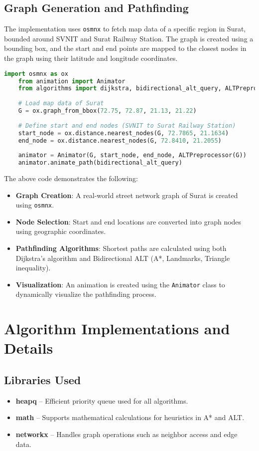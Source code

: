\subsection{Graph Generation and Pathfinding}
The implementation uses \texttt{osmnx} to fetch map data of a specific region in Surat, bounded around SVNIT and Surat Railway Station. The graph is created using a bounding box, and the start and end points are mapped to the closest nodes in the graph using their latitude and longitude coordinates.

\begin{lstlisting}[language=Python, caption={Pathfinding and Animation Code}, label={lst:pathfinding}]
	import osmnx as ox
	from animation import Animator
	from algorithms import dijkstra, bidirectional_alt_query, ALTPreprocessor
	
	# Load map data of Surat
	G = ox.graph_from_bbox(72.75, 72.87, 21.13, 21.22)
	
	# Define start and end nodes (SVNIT to Surat Railway Station)
	start_node = ox.distance.nearest_nodes(G, 72.7865, 21.1634)
	end_node = ox.distance.nearest_nodes(G, 72.8410, 21.2055)
	
	animator = Animator(G, start_node, end_node, ALTPreprocessor(G))
	animator.animate_path(bidirectional_alt_query)
\end{lstlisting}


The above code demonstrates the following:
\begin{itemize}
	\item \textbf{Graph Creation}: A real-world street network graph of Surat is created using \texttt{osmnx}.
	\item \textbf{Node Selection}: Start and end locations are converted into graph nodes using geographic coordinates.
	\item \textbf{Pathfinding Algorithms}: Shortest paths are calculated using both Dijkstra’s algorithm and Bidirectional ALT (A*, Landmarks, Triangle inequality).
	
	\item \textbf{Visualization}: An animation is created using the \texttt{Animator} class to dynamically visualize the pathfinding process.
\end{itemize}


\section*{Algorithm Implementations and Details}

\subsection*{Libraries Used}
\begin{itemize}
	\item \textbf{heapq} -- Efficient priority queue used for all algorithms.
	\item \textbf{math} -- Supports mathematical calculations for heuristics in A* and ALT.
	\item \textbf{networkx} -- Handles graph operations such as neighbor access and edge data.
\end{itemize}

